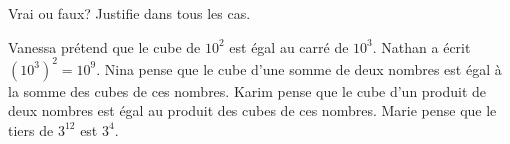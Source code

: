 %
%
Vrai ou faux? Justifie dans tous les cas.
	\begin{tasks}
		\task Vanessa prétend que le cube de $10^2$ est égal au carré de $10^3$.
		\task Nathan a écrit $(10^3)^2=10^9$.
		\task Nina pense que le cube d'une somme de deux nombres est égal à la somme des cubes de ces nombres.
		\task Karim pense que le cube d'un produit de deux nombres est égal au produit des cubes de ces nombres.
		\task Marie pense que le tiers de $3^{12}$ est $3^4$.
	\end{tasks}
